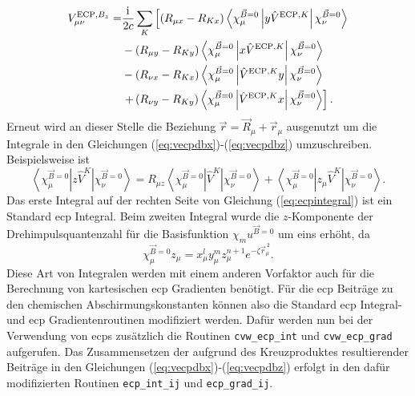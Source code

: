 	\begin{equation}\label{eq:vecpdbz}
	\begin{aligned}
	V_{\mu\nu}^{\textrm{ECP},B_z}=&\frac{\mathrm{i}\mkern1mu}{2c}\sum_K\left[\left(R_{\mu x}-R_{Kx}\right)\left\langle\chi_\mu^{\vec{B}=0}\left\vert y\hat{V}^{\textrm{ECP},K}\right\vert\chi_\nu^{\vec{B}=0}\right\rangle\right.\\
	&-\left(R_{\mu y}-R_{Ky}\right)\left\langle\chi_\mu^{\vec{B}=0}\left\vert x\hat{V}^{\textrm{ECP},K}\right\vert\chi_\nu^{\vec{B}=0}\right\rangle\\
	&-\left(R_{\nu x}-R_{Kx}\right)\left\langle\chi_\mu^{\vec{B}=0}\left\vert \hat{V}^{\textrm{ECP},K}y\right\vert\chi_\nu^{\vec{B}=0}\right\rangle\\
	&\left.+\left(R_{\nu y}-R_{Ky}\right)\left\langle\chi_\mu^{\vec{B}=0}\left\vert \hat{V}^{\textrm{ECP},K} x\right\vert\chi_\nu^{\vec{B}=0}\right\rangle\right].
	\end{aligned}
	\end{equation} 
	Erneut wird an dieser Stelle die Beziehung $\vec{r}=\vec{R}_\mu+\vec{r}_\mu$ ausgenutzt um die Integrale in den Gleichungen (\ref{eq:vecpdbx})-(\ref{eq:vecpdbz}) umzuschreiben. Beispielsweise ist 
	\begin{equation}\label{eq:ecpintegral}
	\left\langle\chi_\mu^{\vec{B}=0}\left\vert z\hat{V}^K\right\vert\chi_\nu^{\vec{B}=0}\right\rangle=R_{\mu z}\left\langle\chi_\mu^{\vec{B}=0}\left\vert \hat{V}^K\right\vert\chi_\nu^{\vec{B}=0}\right\rangle+\left\langle\chi_\mu^{\vec{B}=0}\left\vert z_\mu\hat{V}^K\right\vert\chi_\nu^{\vec{B}=0}\right\rangle.
	\end{equation}
	Das erste Integral auf der rechten Seite von Gleichung (\ref{eq:ecpintegral}) ist ein Standard \ac{ecp} Integral. Beim zweiten Integral wurde die $z$-Komponente der Drehimpulsquantenzahl für die Basisfunktion $\chi_mu^{\vec{B}=0}$ um eins erhöht, da
	\begin{equation}
	\chi_\mu^{\vec{B}=0}z_\mu=x_\mu^ly_\mu^mz_\mu^{n+1}e^{-\zeta\vec{r}^{\, 2}_\mu}.
	\end{equation}
	Diese Art von Integralen werden mit einem anderen Vorfaktor auch für die Berechnung von kartesischen \ac{ecp} Gradienten benötigt. Für die \ac{ecp} Beiträge zu den chemischen Abschirmungskonstanten können also die Standard \ac{ecp} Integral- und \ac{ecp} Gradientenroutinen modifiziert werden. Dafür werden nun bei der Verwendung von \acp{ecp} zusätzlich die Routinen \texttt{cvw\_ecp\_int} und \texttt{cvw\_ecp\_grad} aufgerufen. Das Zusammensetzen der aufgrund des Kreuzproduktes resultierender Beiträge in den Gleichungen (\ref{eq:vecpdbx})-(\ref{eq:vecpdbz}) erfolgt in den dafür modifizierten Routinen \texttt{ecp\_int\_ij} und \texttt{ecp\_grad\_ij}.

